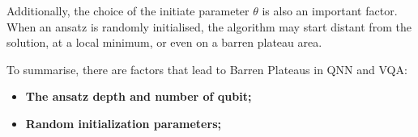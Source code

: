 Additionally, the choice of the initiate parameter $\theta$ is also an important factor. When an ansatz is randomly initialised, the algorithm may start distant from the solution, at a local minimum, or even on a barren plateau area. 

To summarise, there are factors that lead to Barren Plateaus in QNN and VQA:
\begin{itemize}
    \item \textbf{The ansatz depth and number of qubit;}
    \item \textbf{Random initialization parameters;}
\end{itemize}

